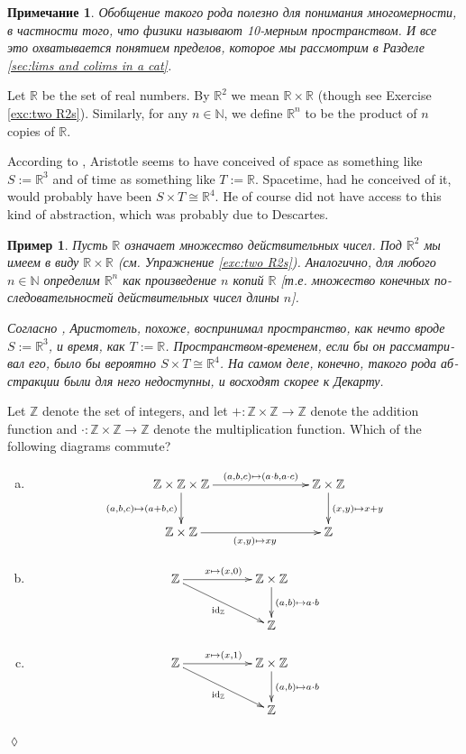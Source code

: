 \documentclass[a4paper]{book}
\def\tn{\textnormal}
\def\ZZ{{\mathbb Z}}
\def\RR{{\mathbb R}}
\def\NN{{\mathbb N}}
\def\hsp{\hspace{.3in}}
\def\to{\rightarrow}
\def\taking{\colon}
\def\iso{\cong}
\def\id{\tn{id}}
\theoremstyle{myth}
\newtheorem{exampleENG}[envENG]{\begin{english}Example\end{english}}
\newtheorem{excENG}[envENG]{\begin{english}Exercise\end{english}}
\newenvironment{exerciseENG}{\begin{excENG}}{\hspace*{\fill}$\lozenge$\end{excENG}}
\newtheorem{remarkRUS}[envRUS]{Примечание}
\newtheorem{exampleRUS}[envRUS]{Пример}
\def\sexc{\begin{enumerate}[a.)]\setlength{\itemsep}{.1cm}\setlength{\parskip}{.1cm}\item}
\def\next{\item}
\def\endsexc{\end{enumerate}}
\begin{document}
\begin{russian}
\begin{remarkRUS}
Обобщение такого рода полезно для понимания многомерности, в частности того, что физики называют 10-мерным пространством. И все это охватывается понятием {\em пределов}, которое мы рассмотрим в Разделе \ref{sec:lims and colims in a cat}.
\end{remarkRUS}

\begin{exampleENG}\label{ex:R2}
Let $\RR$\index{a symbol!$\RR$} be the set of real numbers. By $\RR^2$ we mean $\RR\times\RR$ (though see Exercise \ref{exc:two R2s}). Similarly, for any $n\in\NN$, we define $\RR^n$ to be the product of $n$ copies of $\RR$. 

According to \cite{Pen}, Aristotle seems to have conceived of space as something like $S:=\RR^3$ and of time as something like $T:=\RR$. Spacetime, had he conceived of it, would probably have been $S\times T\iso\RR^4$. He of course did not have access to this kind of abstraction, which was probably due to Descartes. 
\end{exampleENG}

\begin{exampleRUS}\label{ex:R2}
Пусть $\RR$\index{символ!$\RR$} означает множество действительных чисел. Под $\RR^2$ мы имеем в виду $\RR\times\RR$ (см. Упражнение \ref{exc:two R2s}). Аналогично, для любого $n\in\NN$ определим $\RR^n$ как произведение $n$ копий $\RR$ [т.е. множество конечных последовательностей действительных чисел длины $n$]. 

Согласно \cite{Pen}, Аристотель, похоже, воспринимал пространство, как нечто вроде $S:=\RR^3$, и время, как $T:=\RR$. Пространством-временем, если бы он рассматривал его, было бы вероятно $S\times T\iso\RR^4$. На самом деле, конечно, такого рода абстракции были для него недоступны, и восходят скорее к Декарту. 
\end{exampleRUS}

\begin{exerciseENG}
Let $\ZZ$ denote the set of integers, and let $+\taking\ZZ\times\ZZ\to\ZZ$ denote the addition function and $\cdot\taking\ZZ\times\ZZ\to\ZZ$ denote the multiplication function. Which of the following diagrams commute?
\sexc $$\xymatrix{
\ZZ\times\ZZ\times\ZZ\ar[rr]^-{(a,b,c)\mapsto(a\cdot b,a\cdot c)}\ar[d]_{(a,b,c)\mapsto(a+b,c)}&\hsp&\ZZ\times\ZZ\ar[d]^{(x,y)\mapsto x+y}\\
\ZZ\times\ZZ\ar[rr]_{(x,y)\mapsto xy}&&\ZZ}
$$
\next $$
\xymatrix{
\ZZ\ar[rr]^{x\mapsto (x,0)}\ar[drr]_{\id_\ZZ}&&\ZZ\times\ZZ\ar[d]^{(a,b)\mapsto a\cdot b}\\&&\ZZ}
$$
\next$$
\xymatrix{
\ZZ\ar[rr]^{x\mapsto (x,1)}\ar[drr]_{\id_\ZZ}&&\ZZ\times\ZZ\ar[d]^{(a,b)\mapsto a\cdot b}\\&&\ZZ}
$$
\endsexc
\end{exerciseENG}


\end{russian}
\end{document}
